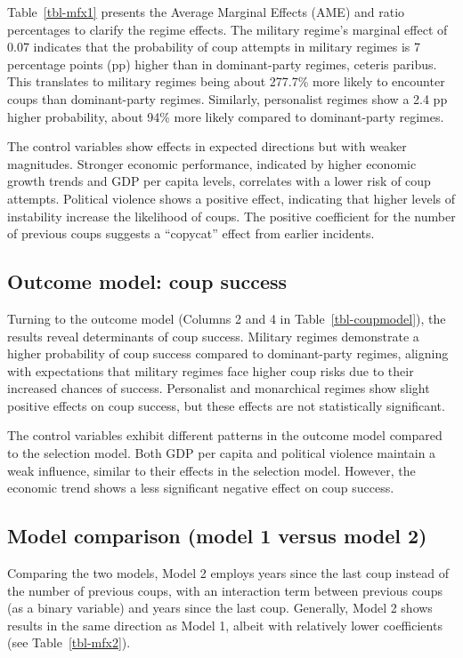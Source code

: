 \documentclass[
  12pt,
]{report}
\begin{document}
Table~\ref{tbl-mfx1} presents the Average Marginal Effects (AME) and
ratio percentages to clarify the regime effects. The military regime's
marginal effect of 0.07 indicates that the probability of coup attempts
in military regimes is 7 percentage points (pp) higher than in
dominant-party regimes, ceteris paribus. This translates to military
regimes being about 277.7\% more likely to encounter coups than
dominant-party regimes. Similarly, personalist regimes show a 2.4 pp
higher probability, about 94\% more likely compared to dominant-party
regimes.

The control variables show effects in expected directions but with
weaker magnitudes. Stronger economic performance, indicated by higher
economic growth trends and GDP per capita levels, correlates with a
lower risk of coup attempts. Political violence shows a positive effect,
indicating that higher levels of instability increase the likelihood of
coups. The positive coefficient for the number of previous coups
suggests a ``copycat'' effect from earlier incidents.

\subsection{Outcome model: coup
success}\label{outcome-model-coup-success}

Turning to the outcome model (Columns 2 and 4 in
Table~\ref{tbl-coupmodel}), the results reveal determinants of coup
success. Military regimes demonstrate a higher probability of coup
success compared to dominant-party regimes, aligning with expectations
that military regimes face higher coup risks due to their increased
chances of success. Personalist and monarchical regimes show slight
positive effects on coup success, but these effects are not
statistically significant.

The control variables exhibit different patterns in the outcome model
compared to the selection model. Both GDP per capita and political
violence maintain a weak influence, similar to their effects in the
selection model. However, the economic trend shows a less significant
negative effect on coup success.

\subsection{Model comparison (model 1 versus model
2)}\label{model-comparison-model-1-versus-model-2}

Comparing the two models, Model 2 employs years since the last coup
instead of the number of previous coups, with an interaction term
between previous coups (as a binary variable) and years since the last
coup. Generally, Model 2 shows results in the same direction as Model 1,
albeit with relatively lower coefficients (see Table~\ref{tbl-mfx2}).
\end{document}
